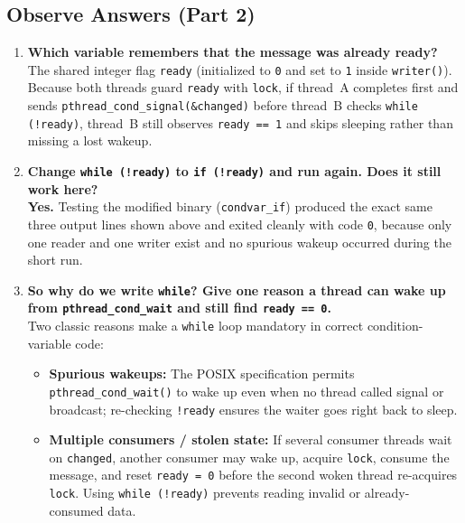 \documentclass[12pt,a4paper]{article}
\begin{document}
\subsection{Observe Answers (Part 2)}
\begin{enumerate}
    \item \textbf{Which variable remembers that the message was already ready?} \\
    The shared integer flag \texttt{ready} (initialized to \texttt{0} and set to \texttt{1} inside \texttt{writer()}). Because both threads guard \texttt{ready} with \texttt{lock}, if thread~A completes first and sends \texttt{pthread\_\allowbreak cond\_\allowbreak signal(\&changed)} before thread~B checks \texttt{while (!ready)}, thread~B still observes \texttt{ready == 1} and skips sleeping rather than missing a lost wakeup.

    \item \textbf{Change \texttt{while (!ready)} to \texttt{if (!ready)} and run again. Does it still work here?} \\
    \textbf{Yes.} Testing the modified binary (\texttt{condvar\_\allowbreak if}) produced the exact same three output lines shown above and exited cleanly with code \texttt{0}, because only one reader and one writer exist and no spurious wakeup occurred during the short run.

    \item \textbf{So why do we write \texttt{while}? Give one reason a thread can wake up from \texttt{pthread\_\allowbreak cond\_\allowbreak wait} and still find \texttt{ready == 0}.} \\
    Two classic reasons make a \texttt{while} loop mandatory in correct condition-variable code:
    \begin{itemize}
        \item \textbf{Spurious wakeups:} The POSIX specification permits \texttt{pthread\_\allowbreak cond\_\allowbreak wait()} to wake up even when no thread called signal or broadcast; re-checking \texttt{!ready} ensures the waiter goes right back to sleep.
        \item \textbf{Multiple consumers / stolen state:} If several consumer threads wait on \texttt{changed}, another consumer may wake up, acquire \texttt{lock}, consume the message, and reset \texttt{ready = 0} before the second woken thread re-acquires \texttt{lock}. Using \texttt{while (!ready)} prevents reading invalid or already-consumed data.
    \end{itemize}
\end{enumerate}
\end{document}
